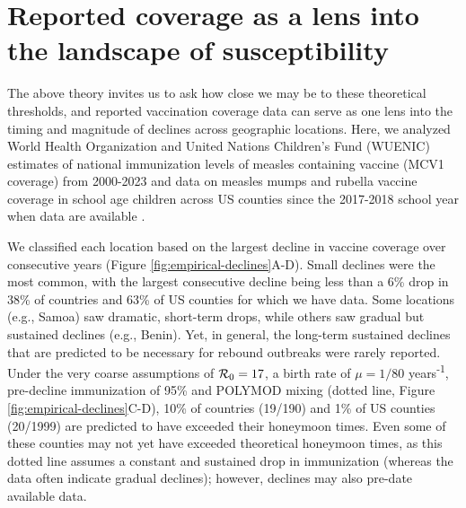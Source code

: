 \section{Reported coverage as a lens into the landscape of susceptibility}
\label{sec:reported-coverage}


The above theory invites us to ask how close we may be to these theoretical thresholds, and reported vaccination coverage data can serve as one lens into the timing and magnitude of declines across geographic locations. Here, we analyzed World Health Organization and United Nations Children's Fund (WUENIC) estimates of national immunization levels of measles containing vaccine (MCV1 coverage) from 2000-2023 \citep{WHO_UNICEF2024} and data on measles mumps and rubella vaccine coverage in school age children across US counties since the 2017-2018 school year when data are available \citep{DongEtAl2025}.

We classified each location based on the largest decline in vaccine coverage over consecutive years (Figure \ref{fig:empirical-declines}A-D). Small declines were the most common, with the largest consecutive decline being less than a 6\% drop in 38\% of countries and 63\% of US counties for which we have data. Some locations (e.g., Samoa) saw dramatic, short-term drops, while others saw gradual but sustained declines (e.g., Benin). Yet, in general, the long-term sustained declines that are predicted to be necessary for rebound outbreaks were rarely reported. Under the very coarse assumptions of $\mathcal{R}_{0} = 17$, a birth rate of $\mu = 1/80$ years\textsuperscript{-1}, pre-decline immunization of 95\% and POLYMOD mixing (dotted line, Figure \ref{fig:empirical-declines}C-D), 10\% of countries (19/190) and 1\% of US counties (20/1999) are predicted to have exceeded their honeymoon times. Even some of these counties may not yet have exceeded theoretical honeymoon times, as this dotted line assumes a constant and sustained drop in immunization (whereas the data often indicate gradual declines); however, declines may also pre-date available data.

